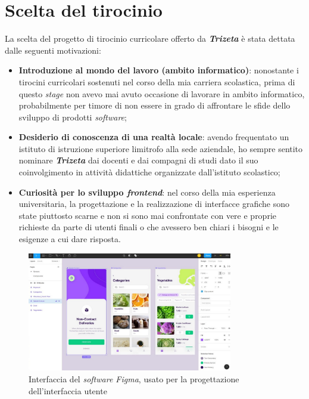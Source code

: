 \section{Scelta del tirocinio}
La scelta del progetto di tirocinio curricolare offerto da \textit{\textbf{Trizeta}} è stata dettata dalle seguenti motivazioni:
\begin{itemize}
    \item \textbf{Introduzione al mondo del lavoro (ambito informatico)}: nonostante i tirocini curricolari sostenuti nel corso della mia carriera scolastica, prima di questo \textit{stage} non avevo mai avuto occasione di lavorare in ambito informatico, 
            probabilmente per timore di non essere in grado di affrontare le sfide dello sviluppo di prodotti \textit{software};
    \item \textbf{Desiderio di conoscenza di una realtà locale}: avendo frequentato un istituto di istruzione superiore limitrofo alla sede aziendale, ho sempre sentito nominare \textit{\textbf{Trizeta}} dai docenti e dai compagni di studi dato il suo 
        coinvolgimento in attività didattiche organizzate dall'istituto scolastico;
    \item \textbf{Curiosità per lo sviluppo \textit{frontend}}: nel corso della mia esperienza universitaria, la progettazione e la realizzazione di interfacce grafiche sono state piuttosto scarne e non si sono mai confrontate con vere e proprie
        richieste da parte di utenti finali o  che avessero ben chiari i bisogni e le esigenze a cui dare risposta.
\end{itemize}

\begin{figure}[H]
    \centering
    \includegraphics[width=0.8\textwidth]{images/figma-editor.jpg}
    \caption[Interfaccia del \textit{software Figma}]{Interfaccia del \textit{software Figma}, usato per la progettazione dell'interfaccia utente\footnotemark}
\end{figure}

